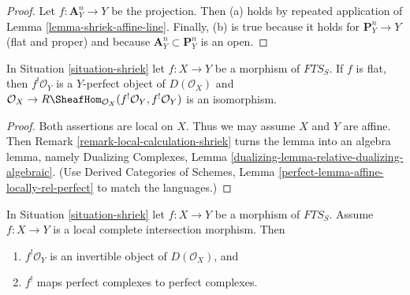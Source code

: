 \begin{proof}
\medskip\noindent
Let $f : \mathbf{A}^n_Y \to Y$ be the projection. Then (a) holds
by repeated application of Lemma \ref{lemma-shriek-affine-line}.
Finally, (b) is true because it holds for $\mathbf{P}^n_Y \to Y$
(flat and proper) and because $\mathbf{A}^n_Y \subset \mathbf{P}^n_Y$
is an open.
\end{proof}

\begin{lemma}
\label{lemma-flat-shriek-relatively-perfect}
In Situation \ref{situation-shriek} let $f : X \to Y$ be a morphism of
$\textit{FTS}_S$. If $f$ is flat, then
$f^!\mathcal{O}_Y$ is a $Y$-perfect object of $D(\mathcal{O}_X)$ and
$\mathcal{O}_X \to
R\SheafHom_{\mathcal{O}_X}(f^!\mathcal{O}_Y, f^!\mathcal{O}_Y)$
is an isomorphism.
\end{lemma}

\begin{proof}
Both assertions are local on $X$. Thus we may assume $X$ and $Y$ are
affine. Then Remark \ref{remark-local-calculation-shriek}
turns the lemma into an algebra lemma, namely
Dualizing Complexes, Lemma \ref{dualizing-lemma-relative-dualizing-algebraic}.
(Use Derived Categories of Schemes, Lemma
\ref{perfect-lemma-affine-locally-rel-perfect} to match the languages.)
\end{proof}

\begin{lemma}
\label{lemma-lci-shriek}
In Situation \ref{situation-shriek} let $f : X \to Y$ be a morphism of
$\textit{FTS}_S$. Assume $f : X \to Y$ is a local complete
intersection morphism. Then
\begin{enumerate}
\item $f^!\mathcal{O}_Y$ is an invertible object of $D(\mathcal{O}_X)$, and
\item $f^!$ maps perfect complexes to perfect complexes.
\end{enumerate}
\end{lemma}

